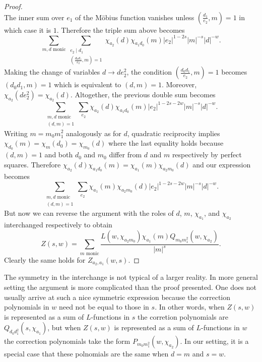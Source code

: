 \documentclass[12pt,reqno,oneside]{amsart}
\begin{document}
\begin{proof}
\[        \]
        The inner sum over $e_{1}$ of the M\"obius function vanishes unless $\left(\frac{d_{1}}{e_{2}},m\right) = 1$ in which case it is $1$. Therefore the triple sum above becomes
        \[
            \sum_{\text{$m,d$ monic}}\sum_{\substack{e_{2} \mid d_{1} \\ \left(\frac{d_{0}d_{1}}{e_{2}},m\right) = 1}}\chi_{a_{2}}(d)\chi_{a_{1}d_{0}}(m)|e_{2}|^{1-2s}|m|^{-s}|d|^{-w}.
        \]
        Making the change of variables $d \to de_{2}^{2}$, the condition $\left(\frac{d_{0}d_{1}}{e_{2}},m\right) = 1$ becomes $(d_{0}d_{1},m) = 1$ which is equivalent to $(d,m) = 1$. Moreover, $\chi_{a_{2}}(de_{2}^{2}) = \chi_{a_{2}}(d)$. Altogether, the previous double sum becomes
        \[
            \sum_{\substack{\text{$m,d$ monic} \\ (d,m) = 1}}\sum_{e_{2}}\chi_{a_{2}}(d)\chi_{a_{1}d_{0}}(m)|e_{2}|^{1-2s-2w}|m|^{-s}|d|^{-w}.
        \]
        Writing $m = m_{0}m_{1}^{2}$ analogously as for $d$, quadratic reciprocity implies $\chi_{d_{0}}(m) = \chi_{m}(d_{0}) = \chi_{m_{0}}(d)$ where the last equality holds because $(d,m) = 1$ and both $d_{0}$ and $m_{0}$ differ from $d$ and $m$ respectively by perfect squares. Therefore $\chi_{a_{2}}(d)\chi_{a_{1}d_{0}}(m) = \chi_{a_{1}}(m)\chi_{a_{2}m_{0}}(d)$ and our expression becomes
        \[
            \sum_{\substack{\text{$m,d$ monic} \\ (d,m) = 1}}\sum_{e_{2}}\chi_{a_{1}}(m)\chi_{a_{2}m_{0}}(d)|e_{2}|^{1-2s-2w}|m|^{-s}|d|^{-w}.
        \]
        But now we can reverse the argument with the roles of $d$, $m$, $\chi_{a_{1}}$, and $\chi_{a_{2}}$ interchanged respectively to obtain
        \[
            Z(s,w) = \sum_{\text{$m$ monic}}\frac{L(w,\chi_{a_{2}m_{0}})\chi_{a_{1}}(m)Q_{m_{0}m_{1}^{2}}(w,\chi_{a_{2}})}{|m|^{s}}.
        \]
        Clearly the same holds for $Z_{a_{2},a_{1}}(w,s)$.
    \end{proof}

    The symmetry in the interchange is not typical of a larger reality. In more general setting the argument is more complicated than the proof presented. One does not usually arrive at such a nice symmetric expression because the correction polynomials in $w$ need not be equal to those in $s$. In other words, when $Z(s,w)$ is represented as a sum of $L$-functions in $s$ the corretion polynomials are $Q_{d_{0}d_{1}^{2}}(s,\chi_{a_{1}})$, but when $Z(s,w)$ is represented as a sum of $L$-functions in $w$ the correction polynomials take the form $P_{m_{0}m_{1}^{2}}(w,\chi_{a_{2}})$. In our setting, it is a special case that these polnomials are the same when $d = m$ and $s = w$.
\end{document}
